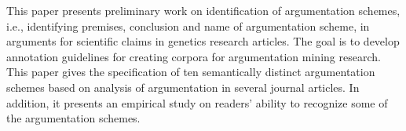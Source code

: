 This paper presents preliminary work on identification of argumentation schemes, i.e., identifying premises, conclusion and name of argumentation scheme, in arguments for scientific claims in genetics research articles. The goal is to develop annotation guidelines for creating corpora for argumentation mining research. This paper gives the specification of ten semantically distinct argumentation schemes based on analysis of argumentation in several journal articles. In addition, it presents an empirical study on readers' ability to recognize some of the argumentation schemes.

